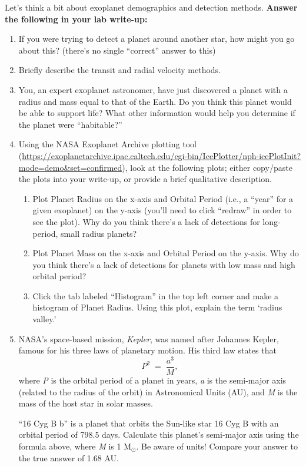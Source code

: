 \documentclass[11pt]{article}
\begin{document}
Let's think a bit about exoplanet demographics and detection methods. \textbf{Answer the following in your lab write-up:}
\begin{enumerate}
    \item If you were trying to detect a planet around another star, how might you go about this? (there's no single ``correct'' answer to this)
    
    \item Briefly describe the transit and radial velocity methods.
    
    \item You, an expert exoplanet astronomer, have just discovered a planet with a radius and mass equal to that of the Earth. Do you think this planet would be able to support life? What other information would help you determine if the planet were ``habitable?''
    
    \item Using the NASA Exoplanet Archive plotting tool (\url{https://exoplanetarchive.ipac.caltech.edu/cgi-bin/IcePlotter/nph-icePlotInit?mode=demo&set=confirmed}), look at the following plots; either copy/paste the plots into your write-up, or provide a brief qualitative description.  
    \begin{enumerate}
        \item Plot Planet Radius on the x-axis and Orbital Period (i.e., a ``year'' for a given exoplanet) on the y-axis (you'll need to click ``redraw'' in order to see the plot). Why do you think there's a lack of detections for long-period, small radius planets?
        
        \item Plot Planet Mass on the x-axis and Orbital Period on the y-axis. Why do you think there's a lack of detections for planets with low mass and high orbital period? 
        
        \item Click the tab labeled ``Histogram'' in the top left corner and make a histogram of Planet Radius. Using this plot, explain the term `radius valley.'
        
    \end{enumerate}
    
    \item NASA's space-based mission, \textit{Kepler}, was named after Johannes Kepler, famous for his three laws of planetary motion. His third law states that \begin{equation}
        P^2 \; = \; \frac{a^3}{M},
    \end{equation}
    where \textit{P} is the orbital period of a planet in years, \textit{a} is the semi-major axis (related to the radius of the orbit) in Astronomical Units (AU), and \textit{M} is the mass of the host star in solar masses.
    
    ``16 Cyg B b'' is a planet that orbits the Sun-like star 16 Cyg B with an orbital period of 798.5 days. Calculate this planet's semi-major axis using the formula above, where \textit{M} is 1 M$_\odot$. Be aware of units! Compare your answer to the true answer of 1.68 AU.
\end{enumerate}
\end{document}
